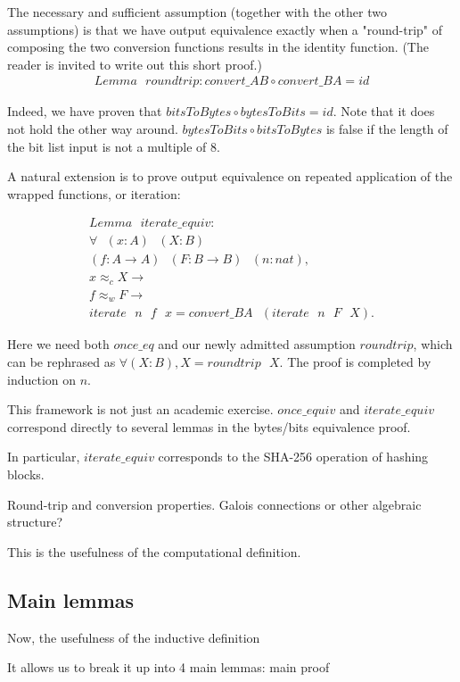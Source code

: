 \documentclass[twocolumn,showpacs,%
  nofootinbib,aps,superscriptaddress,%
  eqsecnum,prd,notitlepage,showkeys,10pt]{revtex4-1}
\newcommand{\eqn}[1] {\begin{gather*}#1\end{gather*}}
\newcommand{\spc} {\textrm{ }}
\begin{document}
The necessary and sufficient assumption (together with the other two assumptions) is that we have output equivalence exactly when a "round-trip" of composing the two conversion functions results in the identity function. (The reader is invited to write out this short proof.)
\eqn{
Lemma \spc roundtrip : convert\_AB \circ convert\_BA = id }

Indeed, we have proven that $bitsToBytes \circ bytesToBits = id$. Note that it does not hold the other way around. $bytesToBits \circ bitsToBytes$ is false if the length of the bit list input is not a multiple of 8.

A natural extension is to prove output equivalence on repeated application of the wrapped functions, or iteration:



\eqn{
Lemma \spc iterate\_equiv : \\
  \forall  \spc (x : A) \spc (X : B)\\
   (f : A \rightarrow A) \spc (F : B \rightarrow B) \spc (n : nat), \\
    x \approx_c X \rightarrow \\
    f \approx_w F \rightarrow \\
    iterate \spc n \spc f \spc x = convert\_BA \spc (iterate \spc n \spc F \spc X).
}

Here we need both $once\_eq$ and our newly admitted assumption $roundtrip$, which can be rephrased as $\forall (X : B), X = roundtrip \spc X$. The proof is completed by induction on $n$.

This framework is not just an academic exercise. $once\_equiv$ and $iterate\_equiv$ correspond directly to several lemmas in the bytes/bits equivalence proof.

In particular, $iterate\_equiv$ corresponds to the SHA-256 operation of hashing blocks. %

Round-trip and conversion properties. Galois connections or other algebraic structure?

This is the usefulness of the computational definition.

\subsection{Main lemmas}

Now, the usefulness of the inductive definition

It allows us to break it up into 4 main lemmas: main proof
\end{document}
